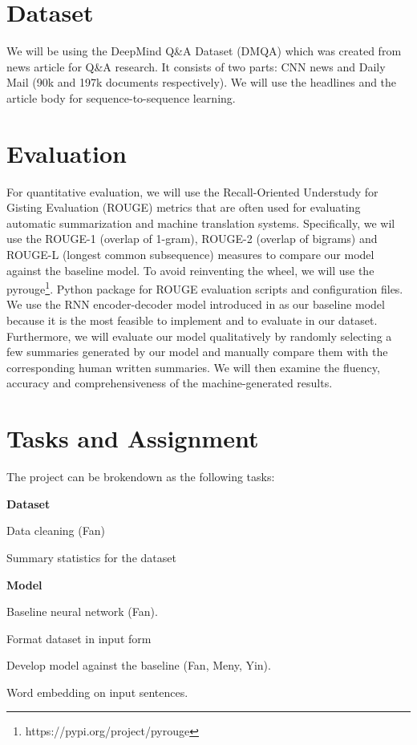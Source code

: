 \section{Dataset}

We will be using the DeepMind Q\&A Dataset (DMQA) which was created from news article for Q\&A research. It consists of two parts: CNN news and Daily Mail (90k and 197k documents respectively). We will use the headlines and the article body for sequence-to-sequence learning.


\section{Evaluation}
For quantitative evaluation, we will use the Recall-Oriented Understudy for Gisting Evaluation (ROUGE) metrics that are often used for evaluating automatic summarization and machine translation systems. Specifically, we wil use the ROUGE-1 (overlap of 1-gram), ROUGE-2 (overlap of bigrams) and ROUGE-L (longest common subsequence) measures to compare our model against the baseline model. To avoid reinventing the wheel, we will use the pyrouge\footnote{https://pypi.org/project/pyrouge}. Python package for ROUGE evaluation scripts and configuration files. 
We use the RNN encoder-decoder model introduced in \cite{cho2014learning} as our baseline model because it is the most feasible to implement and to evaluate in our dataset. Furthermore, we will evaluate our model qualitatively by randomly selecting a few summaries generated by our model and manually compare them with the corresponding human written summaries. We will then examine the fluency, accuracy and comprehensiveness of the machine-generated results.

\section{Tasks and Assignment}

The project can be brokendown as the following tasks:

\noindent
\textbf{Dataset}
\begin{compactitem}
\item Data cleaning (Fan)
\item Summary statistics for the dataset
\end{compactitem}

\noindent
\textbf{Model}
\begin{compactitem}
\item Baseline neural network (Fan).
\item Format dataset in input form 
\item Develop model against the baseline (Fan, Meny, Yin).
\item Word embedding on input sentences.
\end{compactitem}


